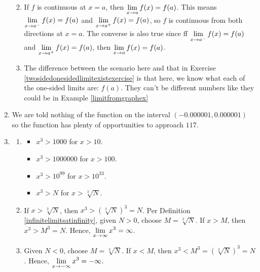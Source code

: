 \begin{enumerate}
\begin{enumerate}
\smallskip

\item If $f$ is continuous at $x=a$, then $\displaystyle{\lim_{x \rightarrow a} f(x) = f(a)}$.  This means  $\displaystyle{\lim_{x \rightarrow a^{-}} f(x) = f(a)}$ and  $\displaystyle{\lim_{x \rightarrow a^{+}} f(x) = f(a)}$, so $f$ is continuous from both directions at $x=a$. The converse is also true since  ff $\displaystyle{\lim_{x \rightarrow a^{-}} f(x) = f(a)}$ and  $\displaystyle{\lim_{x \rightarrow a^{+}} f(x) = f(a)}$, then $\displaystyle{\lim_{x \rightarrow a} f(x) = f(a)}$.

\smallskip

\item  The difference between the scenario here and that in Exercise \ref{twosidedonesidedlimitexistexercise} is that here, we know what each of the one-sided limits are: $f(a)$. They can't be different numbers like they could be in  Example \ref{limitfromgraphex}

\smallskip

\end{enumerate}


\item  We are told nothing of the function on the interval $(-0.000001, 0.000001 )$ so the function has plenty of opportunities to approach $117$.  


\item \begin{enumerate}

\item \begin{itemize} \item  $x^3 > 1000$ for $x > 10$.

\item  $x^3 > 1000000$ for $x > 100$.

\item  $x^3 > 10^{99}$ for $x > 10^{33}$.

\item  $x^3 > N$ for $x > \sqrt[3]{N}$.

\end{itemize}


\item If $x > \sqrt[3]{N}$, then $x^3 > \left(\sqrt[3]{N} \right)^3 = N$.  Per  Definition \ref{infinitelimitsatinfinity}, given $N>0$, choose $M = \sqrt[3]{N}$.  If $x > M$, then $x^3 > M^3 = N$. Hence,  $\displaystyle{\lim_{x \rightarrow \infty} x^3 = \infty}$.

\smallskip

\item Given $N<0$, choose $M = \sqrt[3]{N}$.  If $x< M$, then $x^3 < M^3 = \left(\sqrt[3]{N}\right)^3 = N$.  Hence,   $\displaystyle{\lim_{x \rightarrow -\infty} x^3 = -\infty}$.

\end{enumerate}
 
\end{enumerate}
